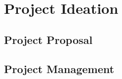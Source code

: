 \chapter{Project Ideation}

\section{Project Proposal}


\clearpage
 \section{Project Management}
 

